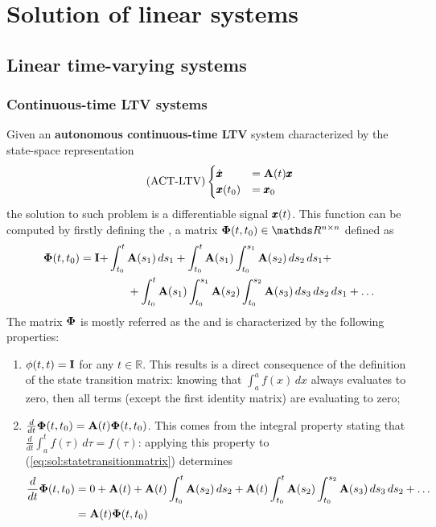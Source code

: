 \chapter{Solution of linear systems} \label{ch:solutions}
\section{Linear time-varying systems}
\subsection*{Continuous-time LTV systems}
	Given an \textbf{autonomous continuous-time LTV} system characterized by the state-space representation
	\begin{equation} \tag{ACT-LTV}
	\begin{cases}
		\dot{\pmb{x}} & = \mathbf{A}(t) \pmb{x} \\ \pmb{x}(t_0) & = \pmb{x}_0
	\end{cases}
	\end{equation}
	the solution to such problem is a differentiable signal $\pmb{x}(t)$. This function can be computed by firstly defining the , a matrix $\mat \Phi(t,t_0)\in \mathds R^{n\times n}$ defined as
	\begin{equation} \label{eq:sol:statetransitionmatrix}
	\begin{split}
		\mathbf{\Phi}(t,t_0) = \mathbf{I} + & \int_{t_0}^t \mathbf{A}(s_1)\, ds_1 + \int_{t_0}^t \mathbf{A}(s_1) \int_{t_0}^{s_1} \mathbf{A}(s_2)\, ds_2\, ds_1 + \\ 
		& \hspace{0.6cm} + \int_{t_0}^t \mathbf{A}(s_1) \int_{t_0}^{s_1} \mathbf{A}(s_2) \int_{t_0}^{s_2} \mathbf{A}(s_3)\, ds_3 \, ds_2\, ds_1 + \dots
	\end{split}
	\end{equation}
	The matrix $\mathbf{\Phi}$ is mostly referred as the  and is characterized by the following properties:
	\begin{enumerate}[\itshape i)]
		\item $\phi(t,t) = \mathbf{I}$ for any $t\in \mathds R$. This results is a direct consequence of the definition of the state transition matrix: knowing that $\int_a^a f(x) \, dx$ always evaluates to zero, then all terms (except the first identity matrix) are evaluating to zero;
		\item $\frac{d}{dt} \mathbf{\Phi}(t,t_0) = \mathbf{A}(t) \mathbf{\Phi}(t,t_0)$. This comes from the integral property stating that $\frac d{dt} \int_a^t f(\tau)\, d\tau = f(\tau)$: applying this property to (\ref{eq:sol:statetransitionmatrix}) determines
		\begin{align*}
			\frac{d}{dt} \mathbf{\Phi}(t,t_0) & = 0 + \mathbf{A}(t) + \mathbf{A}(t) \int_{t_0}^t \mathbf{A}(s_2)\, ds_2 + \mathbf{A}(t) \int_{t_0}^t \mathbf{A}(s_2) \int_{t_0}^{s_2} \mathbf{A}(s_3)\, ds_3\, ds_2 + \dots \\ & = \mathbf{A}(t) \mathbf{\Phi}(t,t_0)
		\end{align*}
	\end{enumerate}

